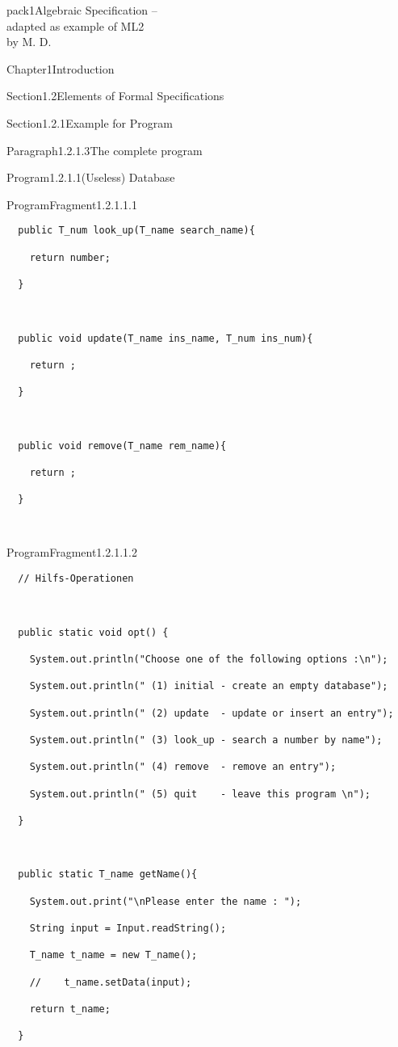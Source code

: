 \documentclass[landscape, slides, light]{mmiss2}
\begin{document}
\begin{Package}{pack1}{Algebraic
Specification -- \\ adapted as example of ML2\\ by M. D.}
\begin{Section}{Chapter1}{Introduction}
\begin{Section}{Section1.2}{Elements of Formal Specifications}{}
\begin{Section}{Section1.2.1}{Example for Program}{}
\begin{Paragraph}{Paragraph1.2.1.3}{The complete program}{}
\begin{Program}{Program1.2.1.1}{(Useless) Database}{}
\begin{ProgramFragment}{ProgramFragment1.2.1.1.1}{}{}
\begin{verbatim}
  public T_num look_up(T_name search_name){

    return number;

  }



  public void update(T_name ins_name, T_num ins_num){

    return ;

  }



  public void remove(T_name rem_name){

    return ;

  }



\end{verbatim}
\normalsize
\end{ProgramFragment}
\begin{ProgramFragment}{ProgramFragment1.2.1.1.2}{}{}
\tiny
\begin{verbatim}
  // Hilfs-Operationen



  public static void opt() {

    System.out.println("Choose one of the following options :\n");

    System.out.println(" (1) initial - create an empty database");

    System.out.println(" (2) update  - update or insert an entry");

    System.out.println(" (3) look_up - search a number by name");

    System.out.println(" (4) remove  - remove an entry");

    System.out.println(" (5) quit    - leave this program \n");

  }



  public static T_name getName(){

    System.out.print("\nPlease enter the name : ");

    String input = Input.readString();

    T_name t_name = new T_name();

    //    t_name.setData(input);

    return t_name;

  }




\end{verbatim}
\end{ProgramFragment}
\end{Program}
\end{Paragraph}
\end{Section}
\end{Section}
\end{Section}
\end{Package}
\end{document}
